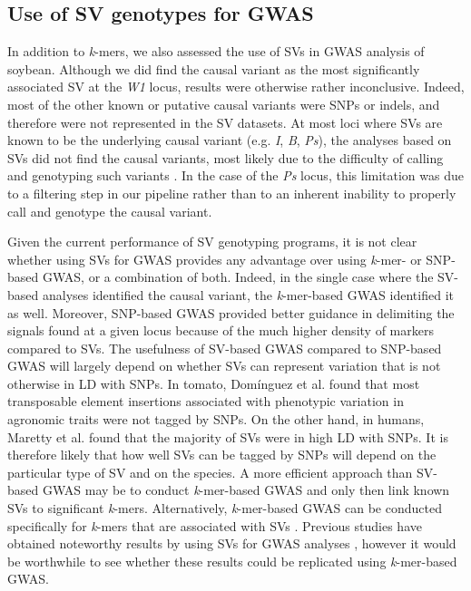 \documentclass{article}
\begin{document}
\subsection*{Use of SV genotypes for GWAS}

In addition to \emph{k}-mers, we also assessed the use of SVs in GWAS analysis
of soybean.  Although we did find the causal variant as the most significantly
associated SV at the \emph{W1} locus, results were otherwise rather
inconclusive.  Indeed, most of the other known or putative causal variants were
SNPs or indels, and therefore were not represented in the SV datasets. At most
loci where SVs are known to be the underlying causal variant (e.g.  \emph{I},
\emph{B}, \emph{Ps}), the analyses based on SVs did not find the causal
variants, most likely due to the difficulty of calling and genotyping such
variants \citep{kosugi2019, lemay2022}. In the case of the \textit{Ps} locus,
this limitation was due to a filtering step in our pipeline rather than to an
inherent inability to properly call and genotype the causal variant.

Given the current performance of SV genotyping programs, it is not clear
whether using SVs for GWAS provides any advantage over using \emph{k}-mer- or
SNP-based GWAS, or a combination of both.  Indeed, in the single case where the
SV-based analyses identified the causal variant, the \emph{k}-mer-based GWAS
identified it as well. Moreover, SNP-based GWAS provided better guidance
in delimiting the signals found at a given locus because of the much higher
density of markers compared to SVs.  The usefulness of SV-based GWAS compared
to SNP-based GWAS will largely depend on whether SVs can represent variation
that is not otherwise in LD with SNPs. In tomato, Domínguez et al. \cite{dominguez2020} found
that most transposable element insertions associated with phenotypic variation
in agronomic traits were not tagged by SNPs. On the other hand, in humans,
Maretty et al. \cite{maretty2017} found that the majority of SVs were in high LD with SNPs. It
is therefore likely that how well SVs can be tagged by SNPs will depend on the
particular type of SV and on the species. A more efficient approach than
SV-based GWAS may be to conduct \emph{k}-mer-based GWAS and only then link
known SVs to significant \emph{k}-mers.  Alternatively, \textit{k}-mer-based
GWAS can be conducted specifically for \textit{k}-mers that are associated with
SVs \citep{jayakodi2020}.  Previous studies have obtained noteworthy results by
using SVs for GWAS analyses \citep[e.g.][]{zhang2015, akakpo2020,
dominguez2020}, however it would be worthwhile to see whether these results
could be replicated using \emph{k}-mer-based GWAS.
\end{document}
